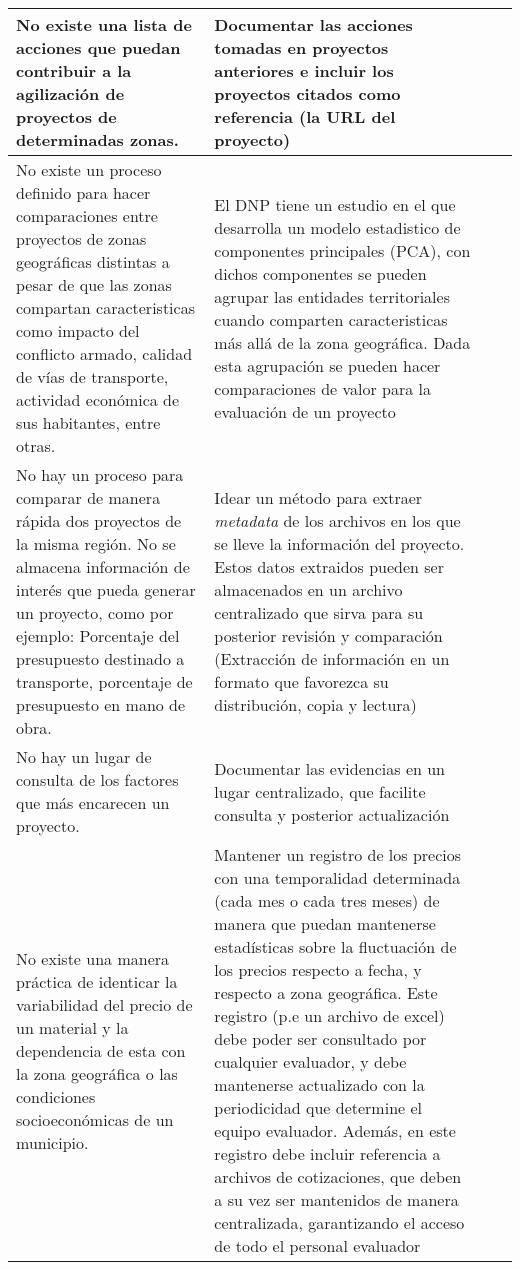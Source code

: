 \documentclass{article}
\begin{document}
\begin{landscape}
\begin{longtable}{ |p{12cm}|p{8cm}|p{2cm}|p{2cm}|}
No existe una lista de acciones que puedan contribuir a la agilización de proyectos de determinadas zonas. & Documentar las acciones tomadas en proyectos anteriores e incluir los proyectos citados como referencia (la URL del proyecto) & & \\\hline

No existe un proceso definido para hacer comparaciones entre proyectos de zonas geográficas distintas a pesar de que las zonas compartan caracteristicas como impacto del conflicto armado, calidad de vías de transporte, actividad económica de sus habitantes, entre otras. & El DNP tiene un estudio \cite{tipologiasDNP} en el que desarrolla un modelo estadistico de componentes principales (PCA), con dichos componentes se pueden agrupar las entidades territoriales cuando comparten caracteristicas más allá de la zona geográfica. Dada esta agrupación se pueden hacer comparaciones de valor para la evaluación de un proyecto & & \\\hline

No hay un proceso para comparar de manera rápida dos proyectos de la misma región. No se almacena información de interés que pueda generar un proyecto, como por ejemplo: Porcentaje del presupuesto destinado a transporte, porcentaje de presupuesto en mano de obra. & Idear un método para extraer \emph{metadata} de los archivos en los que se lleve la información del proyecto. Estos datos extraidos pueden ser almacenados en un archivo centralizado que sirva para su posterior revisión y comparación (Extracción de información en un formato que favorezca su distribución, copia y lectura) & & \\\hline

No hay un lugar de consulta de los factores que más encarecen un proyecto. & Documentar las evidencias en un lugar centralizado, que facilite consulta y posterior actualización & & \\\hline

No existe una manera práctica de identicar la variabilidad del precio de un material y la dependencia de esta con la zona geográfica o las condiciones socioeconómicas de un municipio. & Mantener un registro de los precios con una temporalidad determinada (cada mes o cada tres meses) de manera que puedan mantenerse estadísticas sobre la fluctuación de los precios respecto a fecha, y respecto a zona geográfica. Este registro (p.e un archivo de excel) debe poder ser consultado por cualquier evaluador, y debe mantenerse actualizado con la periodicidad que determine el equipo evaluador. Además, en este registro debe incluir referencia a archivos de cotizaciones, que deben a su vez ser mantenidos de manera centralizada, garantizando el acceso de todo el personal evaluador & & \\\hline


\end{longtable}
\end{landscape}
\end{document}
